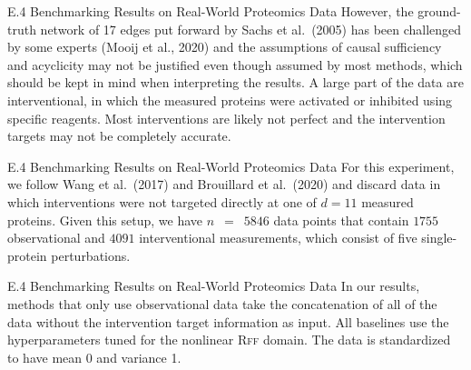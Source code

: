 \documentclass[aspectratio=169,10pt]{beamer}
\newcommand{\domain}[1]{\textsc{#1}}
\newcommand{\rffdomain}{\domain{Rff}\xspace}
\begin{document}
\begin{frame}{E.4 Benchmarking Results on Real-World Proteomics Data}
\small
However, the ground-truth network of \num{17} edges put forward by Sachs et al.\ (2005) has been challenged by some experts (Mooij et al., 2020) and the assumptions of causal sufficiency and acyclicity may not be justified even though assumed by most methods, which should be kept in mind when interpreting the results. A large part of the data are interventional, in which the measured proteins were activated or inhibited using specific reagents. Most interventions are likely not perfect and the intervention targets may not be completely accurate.
\end{frame}

\begin{frame}{E.4 Benchmarking Results on Real-World Proteomics Data}
\small
For this experiment, we follow Wang et al.\ (2017) and Brouillard et al.\ (2020) and discard data in which interventions were not targeted directly at one of $d=11$ measured proteins. Given this setup, we have $n$~$=$~$5846$ data points that contain $1755$ observational and $4091$ interventional measurements, which consist of five single-protein perturbations.
\end{frame}

\begin{frame}{E.4 Benchmarking Results on Real-World Proteomics Data}
In our results, methods that only use observational data take the concatenation of all of the data without the intervention target information as input. All baselines use the hyperparameters tuned for the nonlinear \rffdomain domain. The data is standardized to have mean \num{0} and variance \num{1}.
\end{frame}
\end{document}
